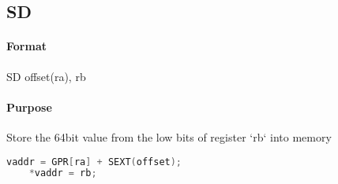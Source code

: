 \subsection{SD}


\paragraph{Format} SD offset(ra), rb

\paragraph{Purpose} Store the 64bit value from the low bits of register `rb` into memory

\begin{lstlisting}[language=C]
    vaddr = GPR[ra] + SEXT(offset);
    *vaddr = rb;
\end{lstlisting}